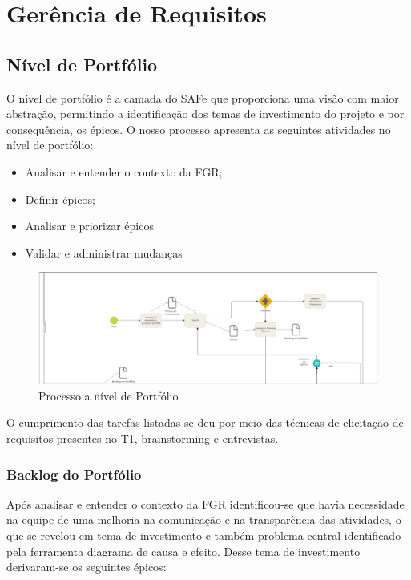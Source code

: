 \chapter{Gerência de Requisitos}
\section{Nível de Portfólio \label{sec:portfolio}}
O nível de portfólio é a camada do SAFe que proporciona uma visão com maior abstração, permitindo a identificação dos temas de investimento
do projeto e por consequência, os épicos. O nosso processo apresenta as seguintes atividades no nível de portfólio:

\begin{itemize}
  \item Analisar e entender o contexto da FGR;
  \item Definir épicos;
  \item Analisar e priorizar épicos
  \item Validar e administrar mudanças
\end{itemize}


\begin{figure}[!h]
        \centering
        \includegraphics[keepaspectratio=true,scale=0.42]{figuras/prog.eps}
        \caption{Processo a nível de Portfólio}
\end{figure}

O cumprimento das tarefas listadas se deu por meio das técnicas de elicitação de requisitos presentes no T1,
 brainstorming e entrevistas.

\subsection{Backlog do Portfólio}

Após analisar e entender o contexto da FGR identificou-se que havia necessidade na equipe de uma melhoria na comunicação
 e na transparência das atividades, o que se revelou em tema de investimento e também problema central identificado pela
  ferramenta diagrama de causa e efeito. Desse tema de investimento derivaram-se os seguintes épicos:

